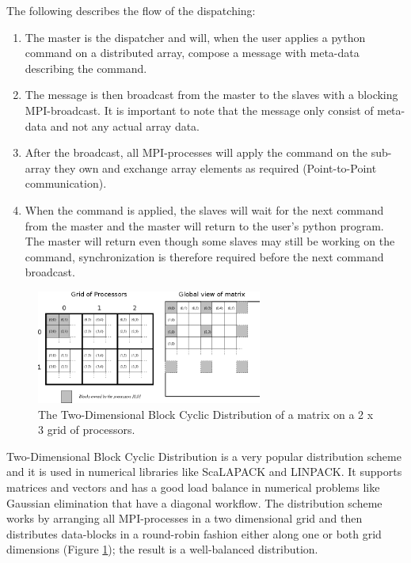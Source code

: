 \documentclass[10pt]{article}
\begin{document}
The following describes the flow of the dispatching:
\begin{enumerate}
\item The master is the dispatcher and will, when the user applies a python command on a distributed array, compose a message with meta-data describing the command. 
\item The message is then broadcast from the master to the slaves with a blocking MPI-broadcast. It is important to note that the message only consist of meta-data and not any actual array data.
\item After the broadcast, all MPI-processes will apply the command on the sub-array they own and exchange array elements as required (Point-to-Point communication).
\item When the command is applied, the slaves will wait for the next command from the master and the master will return to the user's python program. The master will return even though some slaves may still be working on the command, synchronization is therefore required before the next command broadcast.
\end{enumerate}


\begin{figure}
 \centering
 \includegraphics[width=280px]{gfx/datalayout}
 \caption{The Two-Dimensional Block Cyclic Distribution of a matrix on a 2 x 3 grid of processors.}
 \label{fig:datalayout}
\end{figure}


Two-Dimensional Block Cyclic Distribution is a very popular distribution scheme and it is used in numerical libraries like ScaLAPACK\cite{Blackford96} and LINPACK\cite{linpack79}. It supports matrices and vectors and has a good load balance in numerical problems like Gaussian elimination that have a diagonal workflow. The distribution scheme works by arranging all MPI-processes in a two dimensional grid and then distributes data-blocks in a round-robin fashion either along one or both grid dimensions (Figure \ref {fig:datalayout}); the result is a well-balanced distribution.
\end{document}
